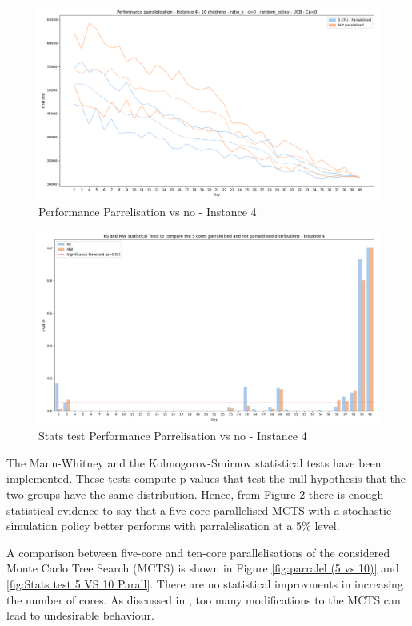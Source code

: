 \begin{figure}[!ht]
    \centering
    \includegraphics[width=\textwidth]{Figures/4 - Paralelised vs 5 CPU paralelised.png}
    \caption{Performance Parrelisation vs no - Instance 4}
    \label{fig:sim_perf_parral_4}
\end{figure}

\begin{figure}[!ht]
    \centering
    \includegraphics[width=\textwidth]{Figures/Distribution stats tests P vs NP.png}
    \caption{Stats test Performance Parrelisation vs no - Instance 4}
    \label{fig:stats test parralel}
\end{figure}
The Mann-Whitney and the Kolmogorov-Smirnov statistical tests have been implemented. These tests compute p-values that test the null hypothesis that the two groups have the same distribution. Hence, from Figure \ref{fig:stats test parralel} there is enough statistical evidence to say that a five core parallelised MCTS with a stochastic simulation policy better performs with parralelisation at a 5\% level.

A comparison between five-core and ten-core parallelisations of the considered Monte Carlo Tree Search (MCTS) is shown in Figure \ref{fig:parralel (5 vs 10)} and \ref{fig:Stats test 5 VS 10 Parall}. There are no statistical improvments in increasing the number of cores. As discussed in \cite{different_selection_policies}, too many modifications to the MCTS can lead to undesirable behaviour.

